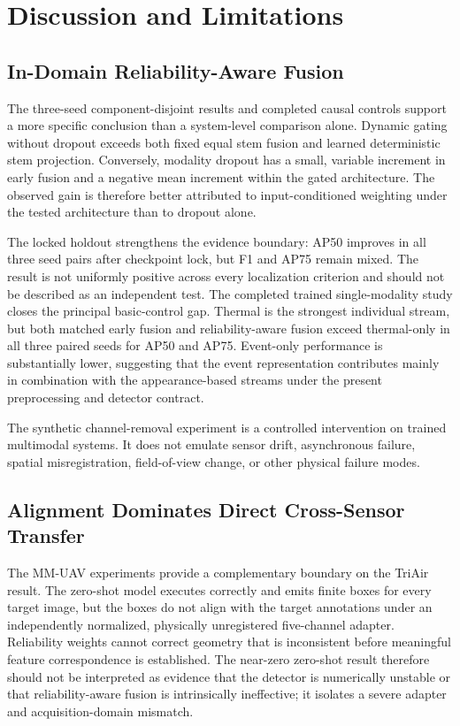 \section{Discussion and Limitations}
\subsection{In-Domain Reliability-Aware Fusion}
The three-seed component-disjoint results and completed causal controls support a more specific conclusion than a system-level comparison alone. Dynamic gating without dropout exceeds both fixed equal stem fusion and learned deterministic stem projection. Conversely, modality dropout has a small, variable increment in early fusion and a negative mean increment within the gated architecture. The observed gain is therefore better attributed to input-conditioned weighting under the tested architecture than to dropout alone.

The locked holdout strengthens the evidence boundary: AP50 improves in all three seed pairs after checkpoint lock, but F1 and AP75 remain mixed. The result is not uniformly positive across every localization criterion and should not be described as an independent test. The completed trained single-modality study closes the principal basic-control gap. Thermal is the strongest individual stream, but both matched early fusion and reliability-aware fusion exceed thermal-only in all three paired seeds for AP50 and AP75. Event-only performance is substantially lower, suggesting that the event representation contributes mainly in combination with the appearance-based streams under the present preprocessing and detector contract.

The synthetic channel-removal experiment is a controlled intervention on trained multimodal systems. It does not emulate sensor drift, asynchronous failure, spatial misregistration, field-of-view change, or other physical failure modes.

\subsection{Alignment Dominates Direct Cross-Sensor Transfer}
The MM-UAV experiments provide a complementary boundary on the TriAir result. The zero-shot model executes correctly and emits finite boxes for every target image, but the boxes do not align with the target annotations under an independently normalized, physically unregistered five-channel adapter. Reliability weights cannot correct geometry that is inconsistent before meaningful feature correspondence is established. The near-zero zero-shot result therefore should not be interpreted as evidence that the detector is numerically unstable or that reliability-aware fusion is intrinsically ineffective; it isolates a severe adapter and acquisition-domain mismatch.

